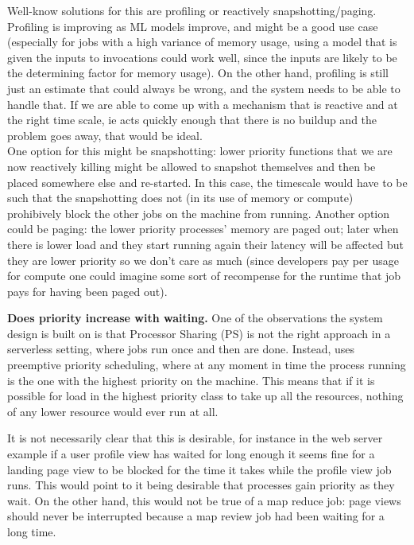 Well-know solutions for this are profiling or reactively snapshotting/paging.
Profiling is improving as ML models improve, and might be a good use case
(especially for jobs with a high variance of memory usage, using a model that is
given the inputs to invocations could work well, since the inputs are likely to
be the determining factor for memory usage). On the other hand, profiling is
still just an estimate that could always be wrong, and the system needs to be
able to handle that. If we are able to come up with a mechanism that is reactive
and at the right time scale, ie acts quickly enough that there is no buildup and
the problem goes away, that would be ideal. \\
One option for this might be snapshotting: lower priority functions that we are now
reactively killing might be allowed to snapshot themselves and then be placed
somewhere else and re-started. In this case, the timescale would have to be such
that the snapshotting does not (in its use of memory or compute) prohibively
block the other jobs on the machine from running. Another option could be
paging: the lower priority processes' memory are paged out; later when there is
lower load and they start running again their latency will be affected but they
are lower priority so we don't care as much (since developers pay per usage for
compute one could imagine some sort of recompense for the runtime that job pays
for having been paged out).


\textbf{Does priority increase with waiting.}
One of the observations the system design is built on is that Processor Sharing
(PS) is not the right approach in a serverless setting, where jobs run once and
then are done. Instead, \sys{} uses preemptive priority scheduling, where at any
moment in time the process running is the one with the highest priority on the
machine. This means that if it is possible for load in the highest priority
class to take up all the resources, nothing of any lower resource would ever run
at all. 

It is not necessarily clear that this is desirable, for instance in the web
server example if a user profile view has waited for long enough it seems fine
for a landing page view to be blocked for the time it takes while the profile
view job runs. This would point to it being desirable that processes gain
priority as they wait. On the other hand, this would not be true of a map reduce
job: page views should never be interrupted because a map review job had been
waiting for a long time.

